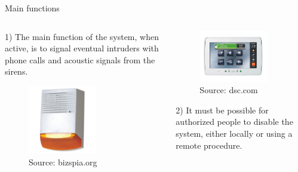 \begin{frame}{Main functions}

  \begin{columns}
   \begin{column}{.50\textwidth}
      1) The main function of the system, when active, is to signal eventual
      intruders with phone calls and acoustic signals from the sirens.

      \begin{figure}[ht!]
        \centering
        \includegraphics[width=30mm]{images/siren.jpg}
        \caption{Source: bizspia.org}
      \end{figure}

   \end{column}

   \begin{column}{.50\textwidth}
   \vskip 0.1cm

   \begin{figure}[ht!]
     \centering
     \includegraphics[width=30mm]{images/dsc.jpg}
     \caption{Source: dsc.com}
   \end{figure}

   \vskip 0.1cm
   2) It must be possible for authorized people to disable the system,
   either locally or using a remote procedure.
   \end{column}
 \end{columns}

\end{frame}

